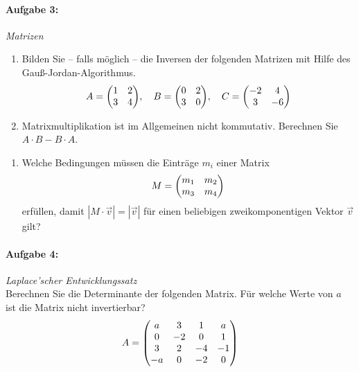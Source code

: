 \paragraph{Aufgabe 3: } \emph{Matrizen}
\begin{enumerate}[label=(\alph*)]
\item Bilden Sie -- falls möglich -- die Inversen der folgenden Matrizen mit Hilfe des Gauß-Jordan-Algorithmus.
\vspace{-3mm}
\begin{align*}
 A =\mqty(1 & 2\\ 3 & 4),\quad B=\mqty(0 & 2\\ 3 & 0),\quad  C=\mqty(-2 & 4\\ 3 & -6)
\end{align*}
\item Matrixmultiplikation ist im Allgemeinen nicht kommutativ. Berechnen Sie $ A \cdot B- B\cdot A$.
\end{enumerate}
\newpage
\begin{enumerate}[label=(\alph*),resume]
\item Welche Bedingungen müssen die Einträge $m_i$ einer Matrix
\begin{align*}
M = \mqty(m_1 & m_2\\ m_3 & m_4)
\end{align*}
erfüllen, damit $| M\cdot \vec{v}|=|\vec{v}|$ für einen beliebigen zweikomponentigen Vektor $\vec{v}$ gilt? 
\end{enumerate}
%
%
\paragraph{Aufgabe 4: } \emph{Laplace'scher Entwicklungssatz}\\[0.2cm]
Berechnen Sie die Determinante der folgenden Matrix. Für welche Werte von $a$ ist die Matrix nicht invertierbar?
\begin{align*}
A=\mqty(a &3 &1 &a\\ 0 &-2 &0 &1\\ 3 &2 &-4 &-1\\ -a& 0 &-2 &0)
\end{align*}
%
